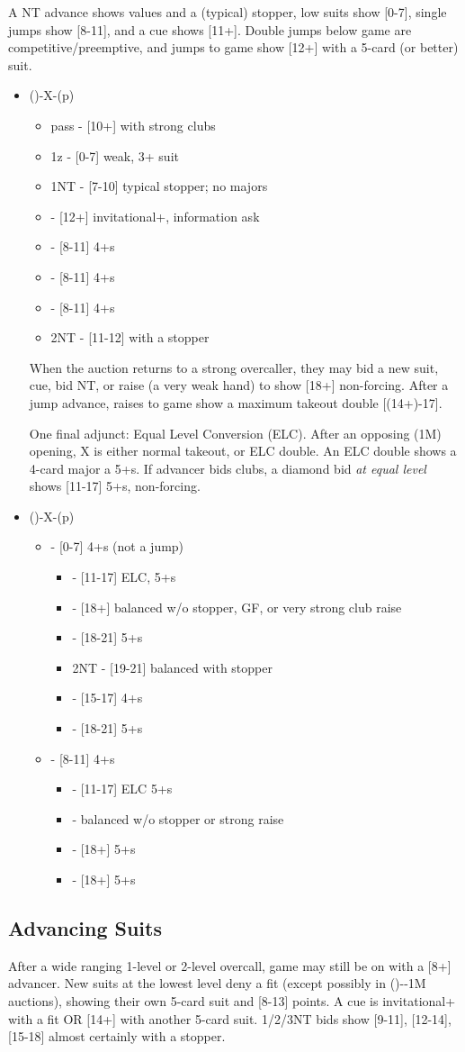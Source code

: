 \documentclass[12pt]{report}
\newcommand{\n}{\\}
\newcommand{\ul}[1]{\begin{itemize}#1\end{itemize}}
\newcommand{\li}{\item[~]}
\begin{document}
    A NT advance shows values and a (typical) stopper, low suits show [0-7], single jumps show [8-11], and a cue shows [11+].  Double jumps below game are competitive/preemptive, and jumps to game show [12+] with a 5-card (or better) suit. \n
    
    \ul {
        \li ()-X-(p)
        \ul {
            \li pass - [10+] with strong clubs
            \li 1z - [0-7] weak, 3+ suit
            \li 1NT - [7-10] \cl{} typical stopper; no majors
            \li \cl2 - [12+] invitational+, information ask
            \li \di2 - [8-11] 4+\di{}s
            \li \he2 - [8-11] 4+\he{}s
            \li \sp2 - [8-11] 4+\sp{}s
            \li 2NT - [11-12] with a stopper
        }

    When the auction returns to a strong overcaller, they may bid a new suit, cue, bid NT, or raise (a very weak hand) to show [18+] non-forcing.  After a jump advance, raises to game show a maximum takeout double [(14+)-17].

    One final adjunct: Equal Level Conversion (ELC).  After an opposing (1M) opening, X is either normal takeout, or ELC double.  An ELC double shows a 4-card major a 5+\di{}s.  If advancer bids clubs, a diamond bid \textit{at equal level} shows [11-17] 5+\di{}s, non-forcing. \n

        \li (\he1)-X-(p)
        \ul {
            \li \cl2 - [0-7] 4+\cl{}s (not a jump)
            \ul {
                \li \di2 - [11-17] ELC, 5+\di{}s
                \li \he2 - [18+] balanced w/o stopper, GF, or very strong club raise
                \li \sp2 - [18-21] 5+\sp{}s
                \li 2NT - [19-21] balanced with stopper
                \li \cl3 - [15-17] 4+\cl{}s
                \li \di3 - [18-21] 5+\di{}s
            }
            \li \cl3 - [8-11] 4+\cl{}s 
            \ul {
                \li \di3 - [11-17] ELC 5+\di{}s
                \li \he3 - balanced w/o stopper or strong raise
                \li \sp3 - [18+] 5+\sp{}s
                \li \di4 - [18+] 5+\di{}s
            }
        }
    }

\subsection{Advancing Suits}

    After a wide ranging 1-level or 2-level overcall, game may still be on with a [8+] advancer.  New suits at the lowest level deny a fit (except possibly in ()--1M auctions), showing their own 5-card suit and [8-13] points.  A cue is invitational+ with a fit OR [14+] with another 5-card suit.  1/2/3NT bids show [9-11], [12-14], [15-18] almost certainly with a stopper. \n
\end{document}
